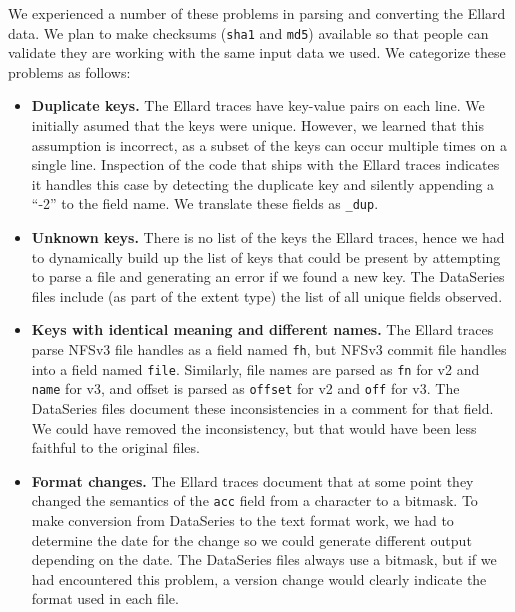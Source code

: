 \documentclass[twocolumn, 11pt]{article}
\begin{document}
We experienced a number of these problems in parsing and converting
the Ellard data.  We plan to make checksums (\texttt{sha1} and
\texttt{md5}) available so that people can validate they are working 
with the same input data we used.  We categorize these problems as 
follows:



\begin{itemize}

\item {\bf Duplicate keys.}  The Ellard traces have key-value pairs on
each line.  We initially asumed that the keys were unique.  However,
we learned that this assumption is incorrect, as a subset of the keys
can occur multiple times on a single line.  Inspection of the code
that ships with the Ellard traces indicates it handles this case by
detecting the duplicate key and silently appending a ``-2'' to the
field name.  We translate these fields as \texttt{\_dup}.

\item {\bf Unknown keys.} There is no list of the keys the Ellard
traces, hence we had to dynamically build up the list of keys that
could be present by attempting to parse a file and generating an error
if we found a new key.  The DataSeries files include (as part of the
extent type) the list of all unique fields observed.

\item {\bf Keys with identical meaning and different names.}  The
Ellard traces parse NFSv3 file handles as a field named \texttt{fh},
but NFSv3 commit file handles into a field named \texttt{file}.
Similarly, file names are parsed as \texttt{fn} for v2 and
\texttt{name} for v3, and offset is parsed as \texttt{offset} for v2
and \texttt{off} for v3. The DataSeries files document these
inconsistencies in a comment for that field.  We could have removed
the inconsistency, but that would have been less faithful to the
original files.

\item {\bf Format changes.}  The Ellard traces document that at some
point they changed the semantics of the \texttt{acc} field from a
character to a bitmask.  To make conversion from DataSeries to the
text format work, we had to determine the date for the change so we
could generate different output depending on the date.  The DataSeries
files always use a bitmask, but if we had encountered this problem, a
version change would clearly indicate the format used in each file.


\end{itemize}
\end{document}
